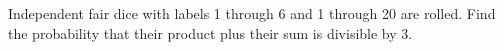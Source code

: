 Independent fair dice with labels 1 through 6 and 1 through 20 are rolled. Find the probability that their product plus their sum is divisible by 3.
